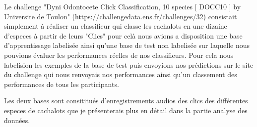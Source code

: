 Le challenge "Dyni Odontocete Click Classification, 10 species [ DOCC10 ]
by Universite de Toulon" (https://challengedata.ens.fr/challenges/32) consistait simplement à réaliser un classifieur qui classe les cachalots en une dizaine d'especes à partir de leurs "Clics" pour celà nous avions a disposition une base d'apprentissage labelisée ainsi qu'une base de test non labelisée sur laquelle nous pouvions évaluer les performances réelles de nos classifieurs. Pour cela nous labelision les exemples de la base de test puis envoyions nos prédictions sur le site du challenge qui nous renvoyais nos performances ainsi qu'un classement des performances de tous les participants.

Les deux bases sont consititués d'enregistrements audios des clics des différentes especes de cachalots que je présenterais plus en détail dans la partie analyse des données.
